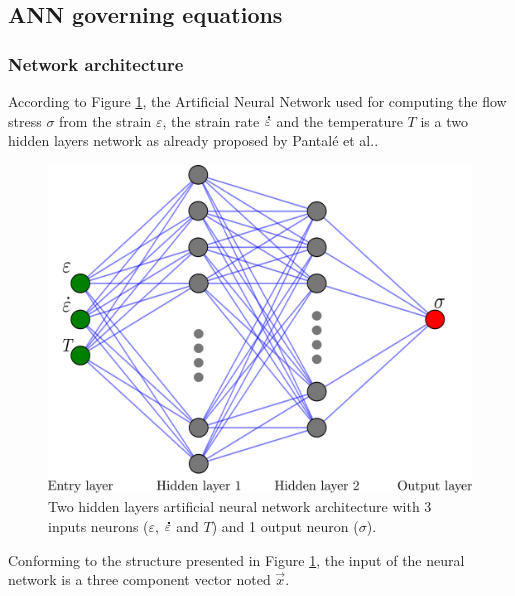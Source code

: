 \documentclass[algorithms,article,submit,pdftex,moreauthors]{Definitions/mdpi}
\makeatletter
\DeclareRobustCommand{\mdot}[1]{\accentset{\mbox{\bfseries .}}{#1}}
\DeclareRobustCommand{\eal}{et al.\@\xspace}
\makeatother
\begin{document}
\subsection{ANN governing equations}\label{subsec:ANN-eqn}

\subsubsection{Network architecture}\label{subsubsec:ANN-arch}
According to Figure \ref{fig:ANN-2HL}, the Artificial Neural Network used for computing the flow stress $\sigma$ from the strain $\varepsilon$, the strain rate $\mdot{\varepsilon}$ and the temperature $T$ is a two hidden layers network as already proposed by Pantalé \eal \cite{Pantale-2021-EIN, Pantale-2023-DIA}.
\begin{figure}[h]
\centering
\includegraphics[width=0.55\columnwidth]{Figures/ANN-2HL}
\caption{Two hidden layers artificial neural network architecture with 3 inputs neurons ($\varepsilon$, $\mdot{\varepsilon}$ and $T$) and 1 output neuron ($\sigma$).}
\label{fig:ANN-2HL}
\end{figure}
Conforming to the structure presented in Figure \ref{fig:ANN-2HL}, the input of the neural network is a three component vector noted $\overrightarrow{x}$.
\end{document}

